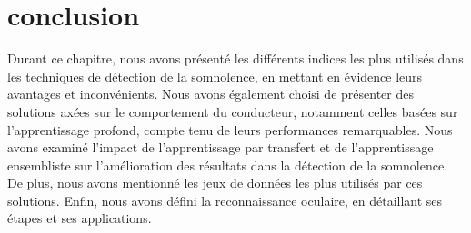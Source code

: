 \section{conclusion}
Durant ce chapitre, nous avons présenté les différents indices les plus utilisés dans les techniques de détection de la somnolence, en mettant en évidence leurs avantages et inconvénients. Nous avons également choisi de présenter des solutions axées sur le comportement du conducteur, notamment celles basées sur l’apprentissage profond, compte tenu de leurs performances remarquables. Nous avons examiné l’impact de l’apprentissage par transfert et de l’apprentissage ensembliste sur l’amélioration des résultats dans la détection de la somnolence. De plus, nous avons mentionné les jeux de données les plus utilisés par ces solutions. Enfin, nous avons défini la reconnaissance oculaire, en détaillant ses étapes et ses applications.












